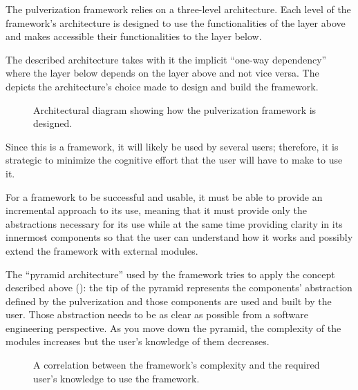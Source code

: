 The pulverization framework relies on a three-level architecture. Each level of the framework's architecture is designed to use the functionalities
of the layer above and makes accessible their functionalities to the layer below.

The described architecture takes with it the implicit ``one-way dependency'' where the layer below depends on the layer above and not vice versa.
The~ depicts the architecture's choice made to design and build the framework.

\begin{figure}
	\centering
	\caption{Architectural diagram showing how the pulverization framework is designed.}
	\label{fig:framework-architecture}
\end{figure}

Since this is a framework, it will likely be used by several users; therefore, it is strategic to minimize the cognitive effort that the user will
have to make to use it.

For a framework to be successful and usable, it must be able to provide an incremental approach to its use,
meaning that it must provide only the abstractions necessary for its use while at the same time providing clarity in its innermost components so that
the user can understand how it works and possibly extend the framework with external modules.

The ``pyramid architecture'' used by the framework tries to apply the concept described above ():
the tip of the pyramid represents the components' abstraction defined by the pulverization and those components are used and built by the user.
Those abstraction needs to be as clear as possible from a software engineering perspective.
As you move down the pyramid, the complexity of the modules increases but the user's knowledge of them decreases.

\begin{figure}
	\centering
	\caption{A correlation between the framework's complexity and the required user's knowledge to use the framework.}
	\label{fig:pyramid-user-knowledge}
\end{figure}

